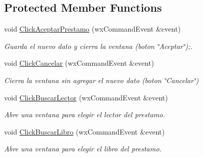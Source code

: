 \subsection*{Protected Member Functions}
\begin{DoxyCompactItemize}
\item 
void \hyperlink{classv_agregar_prestamo_a9cb84e29a5ec874fcf1f9c8882131271}{Click\+Aceptar\+Prestamo} (wx\+Command\+Event \&event)\hypertarget{classv_agregar_prestamo_a9cb84e29a5ec874fcf1f9c8882131271}{}\label{classv_agregar_prestamo_a9cb84e29a5ec874fcf1f9c8882131271}

\begin{DoxyCompactList}\small\item\em Guarda el nuevo dato y cierra la ventana (boton \char`\"{}\+Aceptar\char`\"{});. \end{DoxyCompactList}\item 
void \hyperlink{classv_agregar_prestamo_a6c161bb598feb58d8547573dcb4c23a1}{Click\+Cancelar} (wx\+Command\+Event \&event)\hypertarget{classv_agregar_prestamo_a6c161bb598feb58d8547573dcb4c23a1}{}\label{classv_agregar_prestamo_a6c161bb598feb58d8547573dcb4c23a1}

\begin{DoxyCompactList}\small\item\em Cierra la ventana sin agregar el nuevo dato (boton \char`\"{}\+Cancelar\char`\"{}) \end{DoxyCompactList}\item 
void \hyperlink{classv_agregar_prestamo_ad2ad588e036b261a5b03d3f80d30fca0}{Click\+Buscar\+Lector} (wx\+Command\+Event \&event)\hypertarget{classv_agregar_prestamo_ad2ad588e036b261a5b03d3f80d30fca0}{}\label{classv_agregar_prestamo_ad2ad588e036b261a5b03d3f80d30fca0}

\begin{DoxyCompactList}\small\item\em Abre una ventana para elegir el lector del prestamo. \end{DoxyCompactList}\item 
void \hyperlink{classv_agregar_prestamo_a62a63c956c51c7726a88769414ad6046}{Click\+Buscar\+Libro} (wx\+Command\+Event \&event)\hypertarget{classv_agregar_prestamo_a62a63c956c51c7726a88769414ad6046}{}\label{classv_agregar_prestamo_a62a63c956c51c7726a88769414ad6046}

\begin{DoxyCompactList}\small\item\em Abre una ventana para elegir el libro del prestamo. \end{DoxyCompactList}\end{DoxyCompactItemize}
